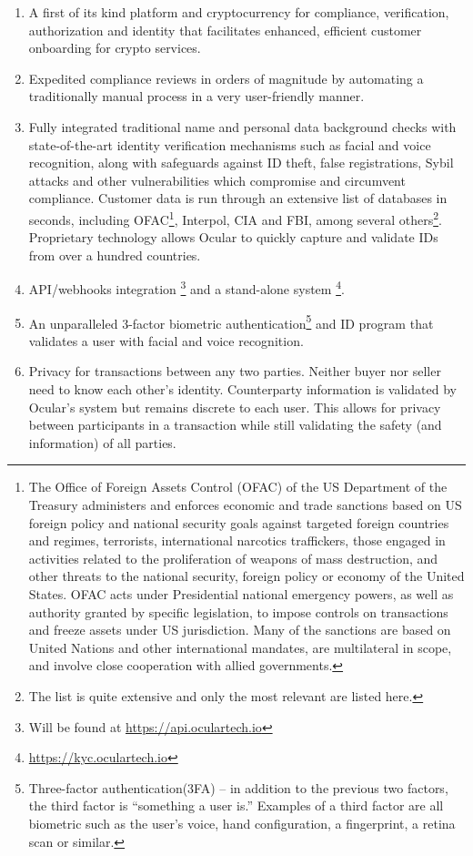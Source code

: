\documentclass[a4paper]{article}
\begin{document}
\begin{enumerate}
\item A first of its kind platform and cryptocurrency for compliance, verification, authorization and identity that facilitates enhanced, efficient customer onboarding for crypto services.
\item Expedited compliance reviews in orders of magnitude by automating a traditionally manual process in a very user-friendly manner.   
\item Fully integrated traditional name and personal data background checks with state-of-the-art identity verification mechanisms such as facial and voice recognition, along with safeguards against ID theft, false registrations, Sybil attacks and other vulnerabilities which compromise and circumvent compliance. Customer data is run through an extensive list of databases in seconds, including OFAC\footnote{The Office of Foreign Assets Control (OFAC) of the US Department of the Treasury administers and enforces economic and trade sanctions based on US foreign policy and national security goals against targeted foreign countries and regimes, terrorists, international narcotics traffickers, those engaged in activities related to the proliferation of weapons of mass destruction, and other threats to the national security, foreign policy or economy of the United States. OFAC acts under Presidential national emergency powers, as well as authority granted by specific legislation, to impose controls on transactions and freeze assets under US jurisdiction. Many of the sanctions are based on United Nations and other international mandates, are multilateral in scope, and involve close cooperation with allied governments.}, Interpol, CIA and FBI, among several others\footnote{The list is quite extensive and only the most relevant are listed here.}. Proprietary technology allows Ocular to quickly capture and validate IDs from over a hundred countries. 
\item API/webhooks integration \footnote{Will be found at \url{https://api.oculartech.io}} and a stand-alone system \footnote{\url{https://kyc.oculartech.io}}. 
\item An unparalleled 3-factor biometric authentication\footnote{Three-factor authentication(3FA) – in addition to the previous two factors, the third factor is “something a user is.” Examples of a third factor are all biometric such as the user's voice, hand configuration, a fingerprint, a retina scan or similar.} and ID program that validates a user with facial and voice recognition.
\item Privacy for transactions between any two parties. Neither buyer nor seller need to know each other’s identity. Counterparty information is validated by Ocular’s system but remains discrete to each user. This allows for privacy between participants in a transaction while still validating the safety (and information) of all parties. 
\end{enumerate}
\end{document}
